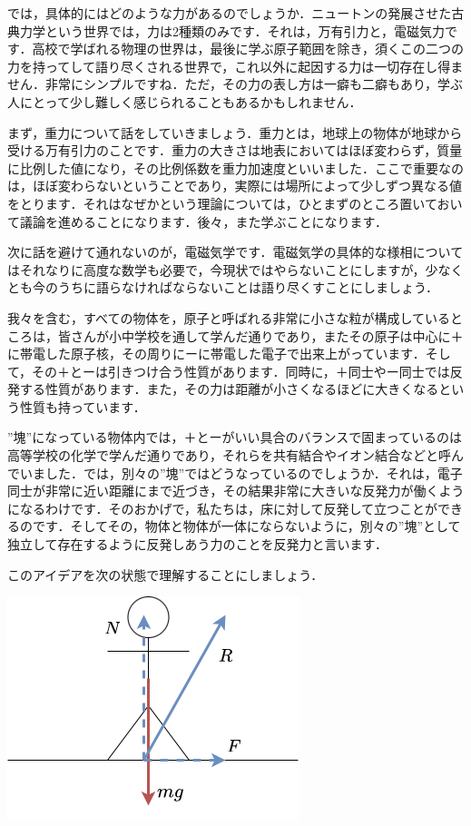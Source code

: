 \documentclass[
  b4paperpaper,
  xelatex,ja=standard]{bxjsbook}
\begin{document}
では，具体的にはどのような力があるのでしょうか．ニュートンの発展させた古典力学という世界では，力は2種類のみです．それは，万有引力と，電磁気力です．高校で学ばれる物理の世界は，最後に学ぶ原子範囲を除き，須くこの二つの力を持ってして語り尽くされる世界で，これ以外に起因する力は一切存在し得ません．非常にシンプルですね．ただ，その力の表し方は一癖も二癖もあり，学ぶ人にとって少し難しく感じられることもあるかもしれません．

まず，重力について話をしていきましょう．重力とは，地球上の物体が地球から受ける万有引力のことです．重力の大きさは地表においてはほぼ変わらず，質量に比例した値になり，その比例係数を重力加速度といいました．ここで重要なのは，ほぼ変わらないということであり，実際には場所によって少しずつ異なる値をとります．それはなぜかという理論については，ひとまずのところ置いておいて議論を進めることになります．後々，また学ぶことになります．

次に話を避けて通れないのが，電磁気学です．電磁気学の具体的な様相についてはそれなりに高度な数学も必要で，今現状ではやらないことにしますが，少なくとも今のうちに語らなければならないことは語り尽くすことにしましょう．

我々を含む，すべての物体を，原子と呼ばれる非常に小さな粒が構成しているところは，皆さんが小中学校を通して学んだ通りであり，またその原子は中心に＋に帯電した原子核，その周りにーに帯電した電子で出来上がっています．そして，その＋とーは引きつけ合う性質があります．同時に，＋同士やー同士では反発する性質があります．また，その力は距離が小さくなるほどに大きくなるという性質も持っています．

''塊''になっている物体内では，＋とーがいい具合のバランスで固まっているのは高等学校の化学で学んだ通りであり，それらを共有結合やイオン結合などと呼んでいました．では，別々の''塊''ではどうなっているのでしょうか．それは，電子同士が非常に近い距離にまで近づき，その結果非常に大きいな反発力が働くようになるわけです．そのおかげで，私たちは，床に対して反発して立つことができるのです．そしてその，物体と物体が一体にならないように，別々の''塊''として独立して存在するように反発しあう力のことを反発力と言います．

このアイデアを次の状態で理解することにしましょう．

\includegraphics{source/images/newton/newton1.png}
\end{document}
